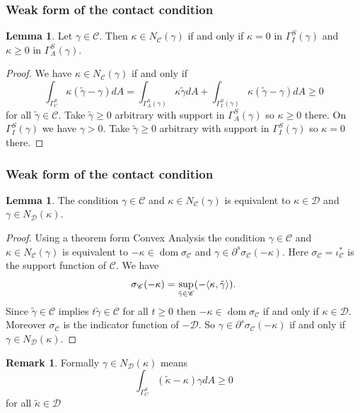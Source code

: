 \documentclass[8pt]{beamer}
\numberwithin{equation}{section}
\theoremstyle{definition}
\newtheorem{lem}[prop]{Lemma}
\newtheorem*{rmk*}{Remark}
\DeclareMathOperator{\dom}{dom}
\DeclarePairedDelimiter{\dual}{\langle}{\rangle}
\begin{document}
\begin{frame}
\frametitle{Weak form of the contact condition}
\begin{lem}
Let $\gamma\in\mathscr{C}$. Then $\kappa\in N_\mathscr{C}(\gamma)$ if and only if $\kappa=0$ in $\Gamma_I^S(\gamma)$ and $\kappa\ge0$ in $\Gamma_A^S(\gamma)$.
\end{lem}
\begin{proof}
We have $\kappa\in N_\mathscr{C}(\gamma)$ if and only if
\[
\int_{\Gamma_C^S}\kappa(\tilde\gamma-\gamma)dA=\int_{\Gamma_A^S(\gamma)}\kappa\tilde\gamma dA+\int_{\Gamma_I^S(\gamma)}\kappa(\tilde\gamma-\gamma)dA\ge0
\]
for all $\tilde\gamma\in\mathscr{C}$. Take $\tilde\gamma\ge0$ arbitrary with support in $\Gamma_A^S(\gamma)$ so $\kappa\ge0$ there. On $\Gamma_I^S(\gamma)$ we have $\gamma>0$. Take $\tilde\gamma\ge0$ arbitrary with support in $\Gamma_I^S(\gamma)$ so $\kappa=0$ there.
\end{proof}
\end{frame}

\begin{frame}
\frametitle{Weak form of the contact condition}
\begin{lem}
The condition $\gamma\in\mathscr{C}$ and $\kappa\in N_\mathscr{C}(\gamma)$ is equivalent to $\kappa\in\mathscr{D}$ and $\gamma\in N_\mathscr{D}(\kappa)$.
\end{lem}
\begin{proof}
Using a theorem form Convex Analysis the condition $\gamma\in\mathscr{C}$ and $\kappa\in N_\mathscr{C}(\gamma)$ is equivalent to $-\kappa\in\dom\sigma_\mathscr{C}$ and $\gamma\in\partial^s\sigma_\mathscr{C}(-\kappa)$. Here $\sigma_\mathscr{C}=\iota_\mathscr{C}^*$ is the support function of $\mathscr{C}$. We have
\[
\sigma_\mathscr{C}(-\kappa)=\sup_{\tilde\gamma\in\mathscr{C}}(-\dual{\kappa,\tilde\gamma}).
\]
Since $\tilde\gamma\in\mathscr{C}$ implies $t\tilde\gamma\in\mathscr{C}$ for all $t\ge0$ then $-\kappa\in\dom\sigma_\mathscr{C}$ if and only if $\kappa\in\mathscr{D}$. Moreover $\sigma_\mathscr{C}$ is the indicator function of $-\mathscr{D}$. So $\gamma\in\partial^s\sigma_\mathscr{C}(-\kappa)$ if and only if $\gamma\in N_\mathscr{D}(\kappa)$.
\end{proof}
\begin{rmk*}
Formally $\gamma\in N_\mathscr{D}(\kappa)$ means
\[
\int_{\Gamma_C^S}(\tilde\kappa-\kappa)\gamma dA\ge0
\]
for all $\tilde\kappa\in\mathscr{D}$
\end{rmk*}
\end{frame}
\end{document}
